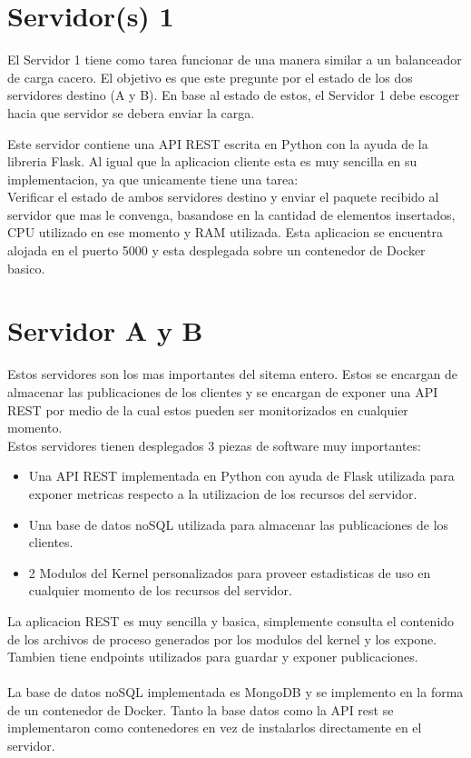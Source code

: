 \documentclass{article}
\begin{document}
\section{Servidor(s) 1}
El Servidor 1 tiene como tarea funcionar de una manera similar
a un balanceador de carga cacero. El objetivo es que este 
pregunte por el estado de los dos servidores destino (A y B).
En base al estado de estos, el Servidor 1 debe escoger hacia
que servidor se debera enviar la carga.

Este servidor contiene una API REST escrita en Python con la 
ayuda de la libreria Flask. Al igual que la aplicacion 
cliente esta es muy sencilla en su implementacion, ya 
que unicamente tiene una tarea:\\
Verificar el estado de ambos servidores destino y enviar 
el paquete recibido al servidor que mas le convenga, basandose
en la cantidad de elementos insertados, CPU utilizado en ese 
momento y RAM utilizada. Esta aplicacion 
se encuentra alojada en el puerto 5000 y esta desplegada 
sobre un contenedor de Docker basico.

\section{Servidor A y B}

Estos servidores son los mas importantes del sitema entero.
Estos se encargan de almacenar las publicaciones de los 
clientes y se encargan de exponer una API REST por medio de la
cual estos pueden ser monitorizados en cualquier momento. \\
Estos servidores tienen desplegados 3 piezas de software muy importantes:
\begin{itemize}
  \item Una API REST implementada en Python con ayuda de Flask 
    utilizada para exponer metricas respecto a la utilizacion 
    de los recursos del servidor.
  \item Una base de datos noSQL utilizada para almacenar las 
    publicaciones de los clientes.
  \item 2 Modulos del Kernel personalizados para proveer 
    estadisticas de uso en cualquier momento de los recursos 
    del servidor.
\end{itemize}

La aplicacion REST es muy sencilla y basica, simplemente 
consulta el contenido de los archivos de proceso generados 
por los modulos del kernel y los expone. Tambien 
tiene endpoints utilizados para guardar y exponer publicaciones.\\\\
La base de datos noSQL implementada es MongoDB y se implemento
en la forma de un contenedor de Docker. Tanto la base datos como la 
API rest se implementaron como contenedores en vez de instalarlos 
directamente en el servidor.\\\\
\end{document}

